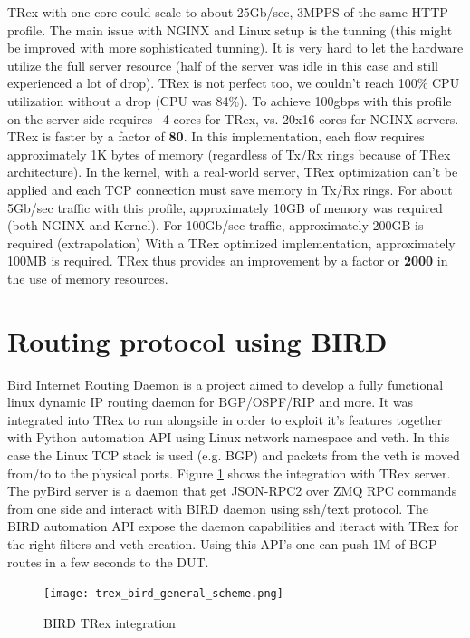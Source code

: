 \documentclass[conference]{IEEEtran}
\begin{document}
TRex with one core could scale to about 25Gb/sec, 3MPPS of the same HTTP profile.
The main issue with NGINX and Linux setup is the tunning (this might be improved with more sophisticated tunning). 
It is very hard to let the hardware utilize the full server resource (half of the server was idle in this case and still experienced a lot of drop). 
TRex is not perfect too, we couldn't reach 100\% CPU utilization without a drop (CPU was 84\%). To achieve 100gbps with this profile on the server side requires ~4 cores for TRex, vs. 20x16 cores for NGINX servers. 
TRex is faster by a factor of \textbf{80}. In this implementation, each flow requires approximately 1K bytes of memory (regardless of Tx/Rx rings because of TRex architecture). 
In the kernel, with a real-world server, TRex optimization can't be applied and each TCP connection must save memory in Tx/Rx rings.
For about 5Gb/sec traffic with this profile, approximately 10GB of memory was required (both NGINX and Kernel). For 100Gb/sec traffic, approximately 200GB is required (extrapolation)  With a TRex optimized implementation, approximately 100MB is required. 
TRex thus provides an improvement by a factor or \textbf{2000} in the use of memory resources.

\section{Routing protocol using BIRD}

Bird Internet Routing Daemon \cite{b4} is a project aimed to develop a fully functional linux dynamic IP routing daemon for BGP/OSPF/RIP and more. 
It was integrated into TRex to run alongside in order to exploit it’s features together with Python automation API using Linux network namespace and veth. 
In this case the Linux TCP stack is used (e.g. BGP) and packets from the veth is moved from/to to the physical ports. 
Figure \ref{fig:bird} shows the integration with TRex server. The pyBird server is a daemon that get JSON-RPC2 over ZMQ RPC commands from one side and interact with BIRD daemon using ssh/text protocol. 
The BIRD automation API expose the daemon capabilities and iteract with TRex for the right filters and veth creation. Using this API's one can push 1M of BGP routes in a few seconds to the DUT.

\begin{figure}[h]
  \texttt{[image: trex\_bird\_general\_scheme.png]}
  \caption{BIRD TRex integration}
  \label{fig:bird}
\end{figure}
\end{document}
